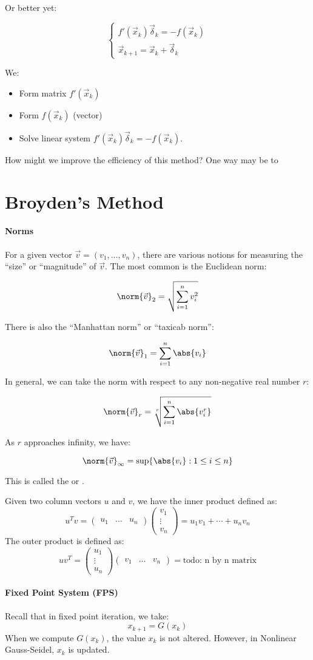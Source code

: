 Or better yet:

\[ \begin{cases}
    f\prime(\vec{x}_k) \vec{\delta}_k = -f(\vec{x}_k) \\
    \vec{x}_{k+1} = \vec{x}_k + \vec{\delta}_k
\end{cases} \]

We:
\begin{itemize}
    \item Form matrix $f\prime(\vec{x}_k)$
    \item Form $f(\vec{x}_k)$ (vector)
    \item Solve linear system $f\prime(\vec{x}_k) \vec{\delta}_k = -f(\vec{x}_k)$.
\end{itemize}

How might we improve the efficiency of this method? One way may be to 

\section{Broyden's Method}

\paragraph{Norms}
For a given vector $\vec{v} = (v_1, \ldots, v_n)$, there are various notions for measuring the ``size'' or ``magnitude'' of $\vec{v}$. The most common is the Euclidean norm:

\[ \norm{\vec{v}}_2 = \sqrt{\sum_{i=1}^{n} v_i^2} \]

There is also the ``Manhattan norm'' or ``taxicab norm'':

\[ \norm{\vec{v}}_1 = \sum_{i=1}^{n} \abs{v_i} \]

In general, we can take the norm with respect to any non-negative real number $r$:

\[ \norm{\vec{v}}_r = \sqrt[r]{\sum_{i=1}^{n} \abs{v_i^r}} \]

As $r$ approaches infinity, we have:

\[ \norm{\vec{v}}_\infty = \sup \{ \abs{v_i} : 1 \leq i \leq n \} \]

This is called the  or .

Given two column vectors $u$ and $v$, we have the inner product defined as:
\[ u^T v = \begin{pmatrix} u_1 & \ldots & u_n \end{pmatrix}\begin{pmatrix}v_1 \\ \vdots \\ v_n \end{pmatrix} = u_1v_1 + \cdots + u_nv_n \]
The outer product is defined as:
\[ u v^T = \begin{pmatrix}u_1 \\ \vdots \\ u_n\end{pmatrix} \begin{pmatrix}v_1 & \ldots & v_n \end{pmatrix} = \text{todo: n by n matrix} \]

\paragraph{Fixed Point System (FPS)}
Recall that in fixed point iteration, we take:
\[ x_{k+1} = G(x_k) \]
When we compute $G(x_k)$, the value $x_k$ is not altered. However, in Nonlinear Gauss-Seidel, $x_k$ is updated.
